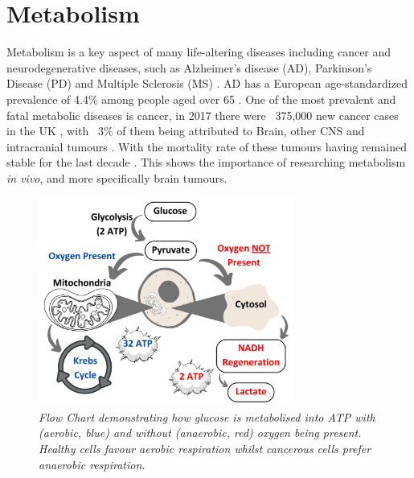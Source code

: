 \documentclass[class=article, crop=false]{standalone}
\begin{document}
\section{Metabolism}

Metabolism is a key aspect of many life-altering diseases including cancer and neurodegenerative diseases, such as Alzheimer's disease (AD), Parkinson's Disease (PD) and Multiple Sclerosis (MS) \cite{Gialleonardo2016TheImaging}. AD has a European age-standardized prevalence of 4.4\% among people aged over 65 \cite{Qiu2009EpidemiologyIntervention}. One of the most prevalent and fatal metabolic diseases is cancer, in 2017 there were ~375,000 new cancer cases in the UK \cite{CancerUK}, with ~3\% of them being attributed to Brain, other CNS and intracranial tumours \cite{BrainUK}. With the mortality rate of these tumours having remained stable for the last decade \cite{BrainUK}. This shows the importance of researching metabolism \textit{in vivo}, and more specifically brain tumours.

\begin{figure}
    \centering
    \includegraphics[width=0.75\textwidth]{Figures/Intro/Metabolism.png}
    \caption{\textit{Flow Chart demonstrating how glucose is metabolised into ATP with (aerobic, blue) and without (anaerobic, red) oxygen being present. Healthy cells favour aerobic respiration whilst cancerous cells prefer anaerobic respiration.}}
    \label{fig:intro:Metabolism}
\end{figure}
\end{document}
